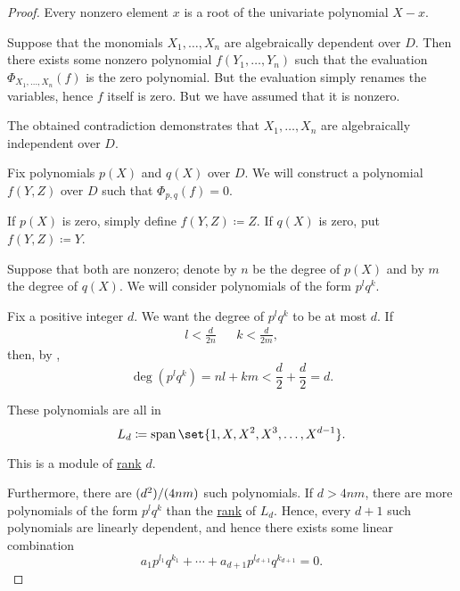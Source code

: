 \begin{proof}
   Every nonzero element \( x \) is a root of the univariate polynomial \( X - x \).

   Suppose that the monomials \( X_1, \ldots, X_n \) are algebraically dependent over \( D \). Then there exists some nonzero polynomial \( f(Y_1, \ldots, Y_n) \) such that the evaluation \( \Phi_{X_1, \dots, X_n}(f) \) is the zero polynomial. But the evaluation simply renames the variables, hence \( f \) itself is zero. But we have assumed that it is nonzero.

  The obtained contradiction demonstrates that \( X_1, \ldots, X_n \) are algebraically independent over \( D \).

   Fix polynomials \( p(X) \) and \( q(X) \) over \( D \). We will construct a polynomial \( f(Y, Z) \) over \( D \) such that \( \Phi_{p,q}(f) = 0 \).

  If \( p(X) \) is zero, simply define \( f(Y, Z) \coloneqq Z \). If \( q(X) \) is zero, put \( f(Y, Z) \coloneqq Y \).

  Suppose that both are nonzero; denote by \( n \) be the degree of \( p(X) \) and by \( m \) the degree of \( q(X) \). We will consider polynomials of the form \( p^l q^k \).

  Fix a positive integer \( d \). We want the degree of \( p^l q^k \) to be at most \( d \). If
  \begin{align*}
    l < \frac d {2n} && k < \frac d {2m},
  \end{align*}
  then, by ,
  \begin{equation*}
    \deg(p^l q^k) = nl + km < \frac d 2 + \frac d 2 = d.
  \end{equation*}

  These polynomials are all in
  \begin{equation*}
    L_d \coloneqq \linspan\set{ 1, X, X^2, X^3, \ldots, X^{d-1} }.
  \end{equation*}

  This is a module of \hyperref[thm:commutative_module_rank]{rank} \( d \).

  Furthermore, there are \( \ifrac* {d^2} {4nm} \) such polynomials. If \( d > 4nm \), there are more polynomials of the form \( p^l q^k \) than the \hyperref[thm:commutative_module_rank]{rank} of \( L_d \). Hence, every \( d + 1 \) such polynomials are linearly dependent, and hence there exists some linear combination
  \begin{equation*}
    a_1 p^{l_1} q^{k_1} + \cdots + a_{d+1} p^{l_{d+1}} q^{k_{d+1}} = 0.
  \end{equation*}


\end{proof}
